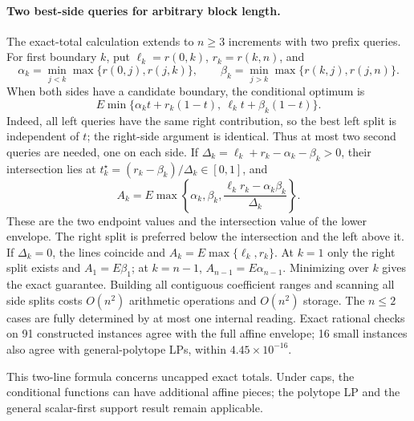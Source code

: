 \paragraph{Two best-side queries for arbitrary block length.}
The exact-total calculation extends to $n\geq3$ increments with two prefix
queries. For first boundary $k$, put $\ell_k=r(0,k)$, $r_k=r(k,n)$, and
\[
 \alpha_k=\min_{j<k}\max\{r(0,j),r(j,k)\},\qquad
 \beta_k=\min_{j>k}\max\{r(k,j),r(j,n)\}.
\]
When both sides have a candidate boundary, the conditional optimum is
\[
 E\min\{\alpha_kt+r_k(1-t),\ \ell_kt+\beta_k(1-t)\}.
\]
Indeed, all left queries have the same right contribution, so the best
left split is independent of $t$; the right-side argument is identical.
Thus at most two second queries are needed, one on each side. If
$\Delta_k=\ell_k+r_k-\alpha_k-\beta_k>0$, their intersection lies at
$t_k^\star=(r_k-\beta_k)/\Delta_k\in[0,1]$, and
\[
 A_k=E\max\left\{\alpha_k,\beta_k,
                \frac{\ell_kr_k-\alpha_k\beta_k}{\Delta_k}\right\}.
\]
These are the two endpoint values and the intersection value of the
lower envelope. The right split is preferred below the intersection and
the left above it. If $\Delta_k=0$, the lines coincide and
$A_k=E\max\{\ell_k,r_k\}$. At $k=1$ only the right split exists and
$A_1=E\beta_1$; at $k=n-1$, $A_{n-1}=E\alpha_{n-1}$.
Minimizing over $k$ gives the exact guarantee. Building all contiguous
coefficient ranges and scanning all side splits costs $O(n^2)$ arithmetic
operations and $O(n^2)$ storage. The $n\leq2$ cases are fully determined
by at most one internal reading. Exact rational checks on 91 constructed
instances agree with the full affine envelope; 16 small instances also
agree with general-polytope LPs, within $4.45\times10^{-16}$.

This two-line formula concerns uncapped exact totals. Under caps, the
conditional functions can have additional affine pieces; the polytope
LP and the general scalar-first support result remain applicable.
